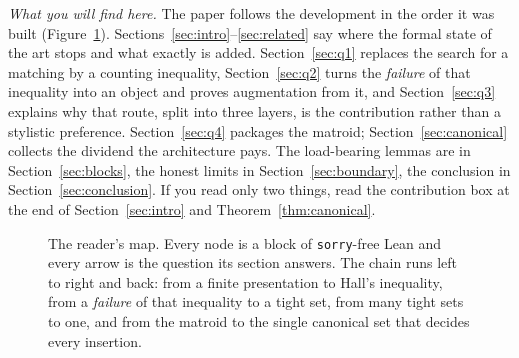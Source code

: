 \documentclass[11pt]{article}
\newcommand{\lean}[1]{\texttt{#1}}
\newcommand{\N}{\mathrm{N}}
\begin{document}
\medskip
\noindent\emph{What you will find here.} The paper follows the development in the order it was
built (Figure~\ref{fig:readermap}). Sections~\ref{sec:intro}--\ref{sec:related} say where the
formal state of the art stops and what exactly is added. Section~\ref{sec:q1} replaces the search
for a matching by a counting inequality, Section~\ref{sec:q2} turns the \emph{failure} of that
inequality into an object and proves augmentation from it, and Section~\ref{sec:q3} explains why
that route, split into three layers, is the contribution rather than a stylistic preference.
Section~\ref{sec:q4} packages the matroid; Section~\ref{sec:canonical} collects the dividend the
architecture pays. The load-bearing lemmas are in Section~\ref{sec:blocks}, the honest limits in
Section~\ref{sec:boundary}, the conclusion in Section~\ref{sec:conclusion}. If you read only two
things, read the contribution box at the end of Section~\ref{sec:intro} and
Theorem~\ref{thm:canonical}.

\begin{figure}[htbp]
\centering
{}
\caption{The reader's map. Every node is a block of \lean{sorry}-free Lean and every arrow is the
question its section answers. The chain runs left to right and back: from a finite presentation to
Hall's inequality, from a \emph{failure} of that inequality to a tight set, from many tight sets to
one, and from the matroid to the single canonical set that decides every insertion.}
\label{fig:readermap}
\end{figure}
\end{document}
